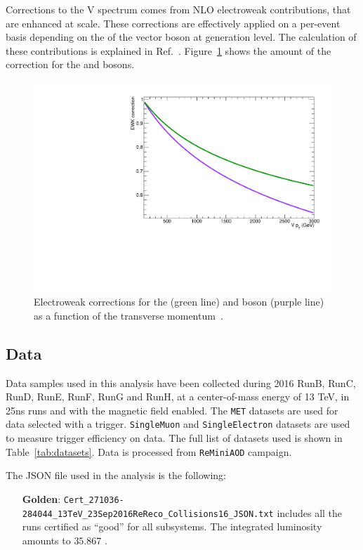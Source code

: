 Corrections to the V \pt spectrum comes from NLO electroweak contributions, that are enhanced at \TeV scale. These corrections are effectively applied on a per-event basis depending on the \pt of the vector boson at generation level. The calculation of these contributions is explained in Ref.~\cite{Kallweit:2015dum}. Figure~\ref{fig:ewk} shows the amount of the correction for the \W and \Z bosons.


\begin{figure}[!htb]
 \centering
   \includegraphics[width=.75\textwidth]{figures/EWK.pdf}
 \caption{Electroweak corrections for the \Z (green line) and \W boson (purple line) as a function of the transverse momentum~\cite{Kallweit:2015dum}.}
 \label{fig:ewk}
\end{figure}



\subsection{Data}
\label{sec:data}

Data samples used in this analysis have been collected during 2016 RunB, RunC, RunD, RunE, RunF, RunG and RunH, at a center-of-mass energy of 13 TeV, in 25ns runs and with the magnetic field enabled. The {\tt MET} datasets are used for data selected with a \met trigger. {\tt SingleMuon} and {\tt SingleElectron} datasets are used to measure trigger efficiency on data. The full list of datasets used is shown in Table~\ref{tab:datasets}. Data is processed from {\tt ReMiniAOD} campaign.

The JSON file used in the analysis is the following:
\begin{itemize}
  \item[{\bf Golden}:] {\tt Cert\_271036-284044\_13TeV\_23Sep2016ReReco\_Collisions16\_JSON.txt} includes all the runs certified as ``good'' for all subsystems. The integrated luminosity amounts to $35.867$ \fbinv.
\end{itemize}



